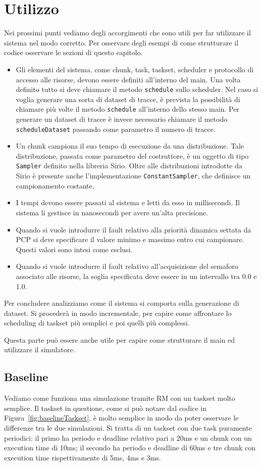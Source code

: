 \chapter{Utilizzo}
Nei prossimi punti vediamo degli accorgimenti che sono utili per far utilizzare il sistema nel modo corretto. Per osservare degli esempi di come strutturare il codice osservare le sezioni di questo capitolo.
\begin{itemize}
    \item Gli elementi del sistema, come chunk, task, taskset, scheduler e protocollo di accesso alle risorse, devono essere definiti all'interno del main. Una volta definito tutto si deve chiamare il metodo \texttt{schedule} sullo scheduler. Nel caso si voglia generare una sorta di dataset di tracce, è prevista la possibilità di chiamare più volte il metodo \texttt{schedule} all'interno dello stesso main. Per generare un dataset di tracce è invece necessario chiamare il metodo \texttt{scheduleDataset} passando come parametro il numero di tracce.
    \item Un chunk campiona il suo tempo di esecuzione da una distribuzione. Tale distribuzione, passata come parametro del costruttore, è un oggetto di tipo \texttt{Sampler} definito nella libreria Sirio. Oltre alle distribuzioni introdotte da Sirio è presente anche l'implementazione \texttt{ConstantSampler}, che definisce un campionamento costante.
    \item I tempi devono essere passati al sistema e letti da esso in millisecondi. Il sistema li gestisce in nanosecondi per avere un'alta precisione.
    \item Quando si vuole introdurre il fault relativo alla priorità dinamica settata da PCP si deve specificare il valore minimo e massimo entro cui campionare. Questi valori sono intesi come esclusi.
    \item Quando si vuole introdurre il fault relativo all'acquisizione del semaforo associato alle risorse, la soglia specificata deve essere in un intervallo tra 0.0 e 1.0.
\end{itemize}
Per concludere analizziamo come il sistema si comporta sulla generazione di dataset. Si procederà in modo incrementale, per capire come affrontare lo scheduling di taskset più semplici e poi quelli più complessi.

Questa parte può essere anche utile per capire come strutturare il main ed utilizzare il simulatore.

\section{Baseline}
Vediamo come funziona una simulazione tramite RM con un taskset molto semplice. Il taskset in questione, come si può notare dal codice in Figura~\ref{fig:baselineTaskset}, è molto semplice in modo da poter osservare le differenze tra le due simulazioni. Si tratta di un taskset con due task puramente periodici: il primo ha periodo e deadline relativo pari a 20ms e un chunk con un execution time di 10ms; il secondo ha periodo e deadline di 60ms e tre chunk con execution time rispettivamente di 5ms, 4ms e 3ms.

